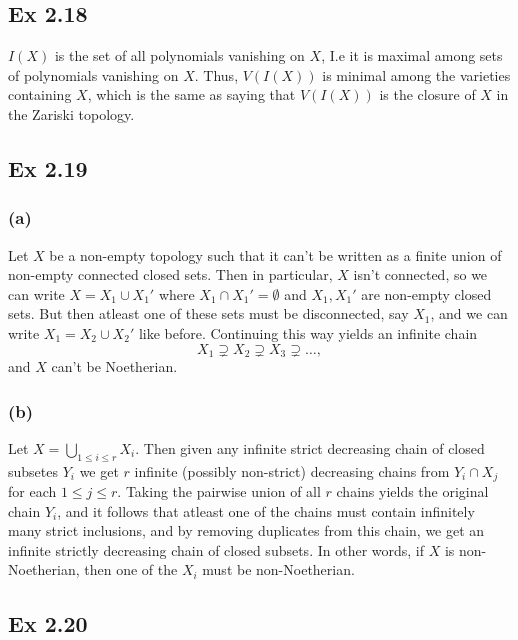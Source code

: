 \documentclass{article}
\theoremstyle{definition}
\begin{document}
\subsection*{Ex 2.18}

$I(X)$ is the set of all polynomials vanishing on $X$, I.e it is maximal among
sets of polynomials vanishing on $X$. Thus, $V(I(X))$ is minimal among the
varieties containing $X$, which is the same as saying that $V(I(X))$ is the
closure of $X$ in the Zariski topology.

\subsection*{Ex 2.19}

\subsubsection*{(a)}

Let $X$ be a non-empty topology such that it can't be written as a finite union
of non-empty connected closed sets. Then in particular, $X$ isn't connected, so
we can write $X = X_1 \cup X_1'$ where $X_1 \cap X_1' = \emptyset$ and $X_1,
X_1'$ are non-empty closed sets. But then atleast one of these sets must be
disconnected, say $X_1$, and we can write $X_1 = X_2 \cup X_2'$ like before.
Continuing this way yields an infinite chain 
\[
X_1 \supsetneq X_2 \supsetneq X_3 \supsetneq \ldots,
\] 
and $X$ can't be Noetherian.

\subsubsection*{(b)}

Let $X = \bigcup_{1 \leq i \leq r} X_i$. Then given any infinite strict
decreasing chain of closed subsetes $Y_i$ we get $r$ infinite (possibly
non-strict) decreasing chains from $Y_i \cap X_j$ for each $1 \leq j \leq r$.
Taking the pairwise union of all $r$ chains yields the original chain $Y_i$,
and it follows that atleast one of the chains must contain infinitely many
strict inclusions, and by removing duplicates from this chain, we get an
infinite strictly decreasing chain of closed subsets. In other words, if $X$ is
non-Noetherian, then one of the $X_i$ must be non-Noetherian.

\subsection*{Ex 2.20}
\end{document}
